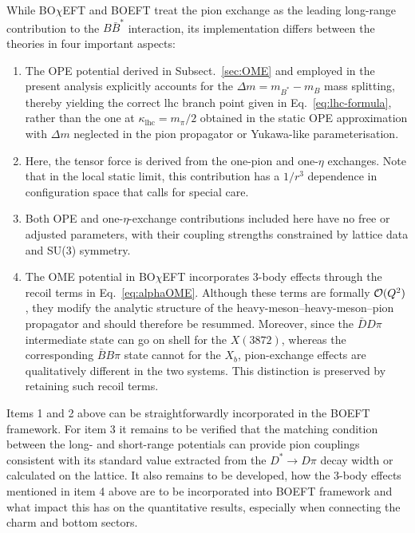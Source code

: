 \documentclass[aps,prd,showpacs,amsmath,twocolumn,superscriptaddress,floatfix,nofootinbib,notitlepage]{revtex4-2}
\newcommand{\X}{X(3872)}
\newcommand{\Xb}{X_b}
\newcommand{\BOchiEFT}{BO$\chi$EFT\xspace}
\begin{document}
While \BOchiEFT and BOEFT treat the pion exchange as the leading long-range contribution to the $B\bar{B}^*$ interaction, 
its implementation differs between the theories in four important aspects:
\begin{enumerate}
\item The OPE potential derived in Subsect.~\ref{sec:OME} and employed in the present analysis explicitly accounts for the $\Delta m=m_{B^*}-m_B$ mass splitting, thereby yielding the correct lhc branch point given in Eq.~\eqref{eq:lhc-formula}, rather than the one at $\kappa_\text{lhc}=m_\pi/2$ obtained in the static OPE approximation with $\Delta m$ neglected in the pion propagator or Yukawa-like parameterisation.
\item Here, the tensor force is derived from the one-pion and one-$\eta$ exchanges. Note that in the local static limit, this contribution has a $1/r^3$ dependence in configuration space that calls for special care.
\item Both OPE and one-$\eta$-exchange contributions included here have no free or adjusted parameters, with their coupling strengths constrained by lattice data and SU(3) symmetry.
\item The OME potential in \BOchiEFT incorporates 3-body effects through the recoil terms in Eq.~\eqref{eq:alphaOME}. Although these terms are formally ${\cal O}(Q^2)$, they modify the analytic structure of the heavy-meson--heavy-meson--pion propagator and should therefore be resummed. Moreover, since the $\bar{D}D\pi$ intermediate state can go on shell for the $ \X$, whereas the corresponding $\bar{B}B\pi$ state cannot for the $\Xb$, pion-exchange effects are qualitatively different in the two systems. This distinction is preserved by retaining such recoil terms.
\end{enumerate}
Items 1 and 2 above can be straightforwardly incorporated in 
the BOEFT framework.
For item 3 it remains to be verified that the matching condition between the long- and short-range potentials can provide pion couplings consistent with its standard value extracted from the $D^*\to D\pi$ decay width or calculated on the lattice.
It also remains to be developed, how the 3-body effects mentioned in item 4 above are to be incorporated into BOEFT framework and what impact this has
on the quantitative results, especially when connecting the charm and bottom sectors. 
\end{document}
